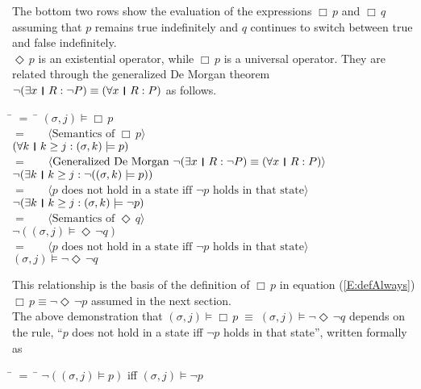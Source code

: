 \documentclass[fleqn, leqno]{article}
\newcommand{\lgap}{2pt}                             %
\newcommand{\mymathindent}{24pt}                    %
\newcommand{\equivs}{\ensuremath{\;\equiv\;}}       %
\newcommand{\Event}{\Diamond\,}
\newcommand{\Always}{\Box\,}
\newcommand{\thedr}{\rule[-.25ex]{.32mm}{1.75ex}}   %
\newcommand{\dr}{\;\,\thedr\,\;}                    %
\newcommand{\rb}{:}                                 %
\newcommand{\all}{\forall}                          %
\newcommand{\ext}{\exists}                          %
\newcommand{\Gll} {\langle}                         %
\newcommand{\Ggg} {\rangle}                         %
\newcommand{\Hint}[1]     {\ \ \ $\Gll              \mbox{#1} \Ggg$ }   %
\begin{document}
The bottom two rows show the evaluation of the expressions $\Always p$ and $\Always q$
assuming that $p$ remains true indefinitely and $q$ continues to switch between true and false indefinitely.\\

$\Event p$ is an existential operator, while $\Always p$ is a universal operator.
They are related through the generalized De Morgan theorem \cite{LADM} $\neg (\ext x\dr R\rb \neg P)\equiv (\all x\dr R\rb P)$
as follows.

\begin{tabbing}
\hspace{\mymathindent} \= $= \;$ \= \kill
	\> \>   $(\sigma, j) \models \Always p$\\[\lgap]
	\> $=$  \>  \Hint{Semantics of $\Always p$}\\[\lgap]
	\> \>   $(\all k \dr k \ge j \rb (\sigma,k) \models p)$\\[\lgap]
	\> $=$  \>  \Hint{Generalized De Morgan $\neg (\ext x\dr R\rb \neg P)\equiv (\all x\dr R\rb P)$}\\[\lgap]
	\> \>   $\neg (\ext k \dr k \ge j \rb \neg((\sigma,k) \models p))$\\[\lgap]
	\> $=$  \>  \Hint{$p$ does not hold in a state iff $\neg p$ holds in that state}\\[\lgap]
	\> \>   $\neg (\ext k \dr k \ge j \rb (\sigma,k) \models \neg p)$\\[\lgap]
	\> $=$  \>  \Hint{Semantics of $\Event q$}\\[\lgap]
	\> \>   $\neg ((\sigma, j) \models \Event \neg q)$\\[\lgap]
	\> $=$  \>  \Hint{$p$ does not hold in a state iff $\neg p$ holds in that state}\\[\lgap]
	\> \>   $(\sigma, j) \models \neg \Event \neg q$
\end{tabbing}

This relationship is the basis of the definition of $\Always p$ in equation (\ref{E:defAlways})
$\Always p \equiv \neg\Event\neg p$ assumed in the next section.\\

The above demonstration that $(\sigma, j) \models \Always p \equivs (\sigma, j) \models \neg \Event \neg q$ depends on the
rule, ``$p$ does not hold in a state iff $\neg p$ holds in that state'', written formally as

\begin{tabbing}
\hspace{\mymathindent} \= $= \;$ \= \kill
  \> $\neg ((\sigma, j) \models p)$ \quad iff \quad $(\sigma, j) \models \neg p$
\end{tabbing}
\end{document}
